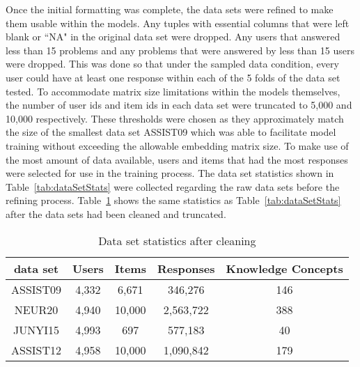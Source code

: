 \documentclass[letterpaper, 12pt, captions=tableabove]{scrreprt}
\begin{document}
			Once the initial formatting was complete, the data sets were refined to make them usable within the models. Any tuples with essential columns that were left blank or ``NA" in the original data set were dropped. Any users that answered less than 15 problems and any problems that were answered by less than 15 users were dropped. This was done so that under the sampled data condition, every user could have at least one response within each of the 5 folds of the data set tested. To accommodate matrix size limitations within the models themselves, the number of user ids and item ids in each data set were truncated to 5,000 and 10,000 respectively. These thresholds were chosen as they approximately match the size of the smallest data set ASSIST09 which was able to facilitate model training without exceeding the allowable embedding matrix size. To make use of the most amount of data available, users and items that had the most responses were selected for use in the training process. The data set statistics shown in Table~\ref{tab:dataSetStats} were collected regarding the raw data sets before the refining process. Table~\ref{tab:refDataSets} shows the same statistics as Table~\ref{tab:dataSetStats} after the data sets had been cleaned and truncated.
	
		\begin{table}[htbp]
			\centering
			\begin{tabular}{c|cccc}
				data set&Users&Items&Responses&Knowledge Concepts\\ \hline
				ASSIST09&4,332&6,671&346,276&146\\ \hline
				NEUR20&4,940&10,000&2,563,722&388\\ \hline
				JUNYI15&4,993&697&577,183&40\\ \hline
				ASSIST12&4,958&10,000&1,090,842&179\\ 
			\end{tabular}
			\caption{Data set statistics after cleaning}
			\label{tab:refDataSets}
		\end{table}
			
\end{document}
